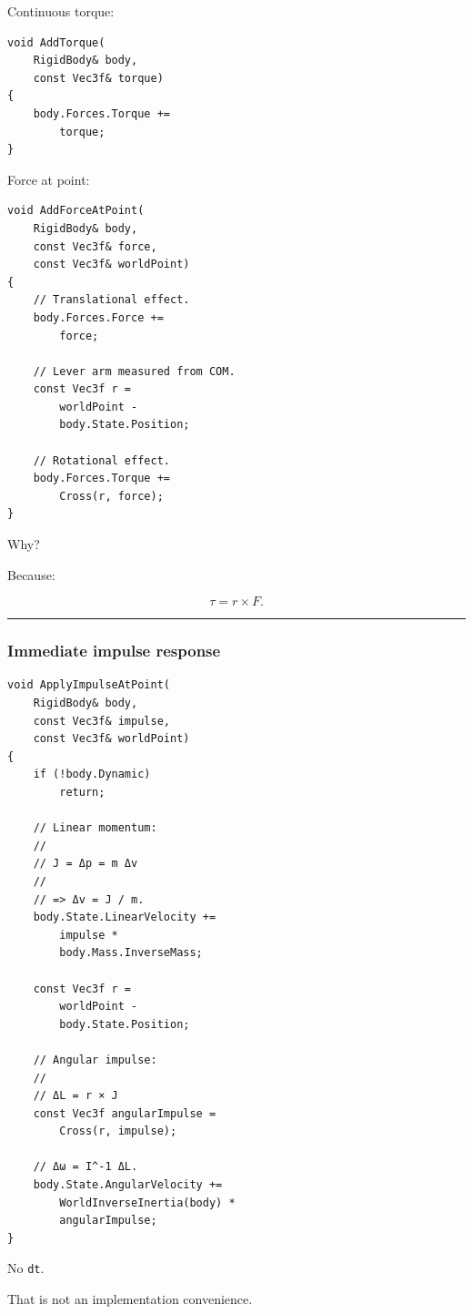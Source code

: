 Continuous torque:

\begin{verbatim}
void AddTorque(
    RigidBody& body,
    const Vec3f& torque)
{
    body.Forces.Torque +=
        torque;
}
\end{verbatim}

Force at point:

\begin{verbatim}
void AddForceAtPoint(
    RigidBody& body,
    const Vec3f& force,
    const Vec3f& worldPoint)
{
    // Translational effect.
    body.Forces.Force +=
        force;

    // Lever arm measured from COM.
    const Vec3f r =
        worldPoint -
        body.State.Position;

    // Rotational effect.
    body.Forces.Torque +=
        Cross(r, force);
}
\end{verbatim}

Why?

Because:

\[
\tau=r\times F.
\]

\begin{center}\rule{0.5\linewidth}{0.5pt}\end{center}

\subsubsection{Immediate impulse response}\label{immediate-impulse-response}

\begin{verbatim}
void ApplyImpulseAtPoint(
    RigidBody& body,
    const Vec3f& impulse,
    const Vec3f& worldPoint)
{
    if (!body.Dynamic)
        return;

    // Linear momentum:
    //
    // J = Δp = m Δv
    //
    // => Δv = J / m.
    body.State.LinearVelocity +=
        impulse *
        body.Mass.InverseMass;

    const Vec3f r =
        worldPoint -
        body.State.Position;

    // Angular impulse:
    //
    // ΔL = r × J
    const Vec3f angularImpulse =
        Cross(r, impulse);

    // Δω = I^-1 ΔL.
    body.State.AngularVelocity +=
        WorldInverseInertia(body) *
        angularImpulse;
}
\end{verbatim}

No \texttt{dt}.

That is not an implementation convenience.

